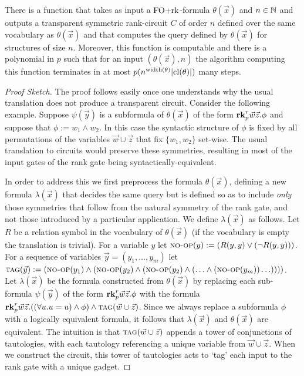 \documentclass[a4paper,UKenglish]{lipics-v2018}
\begin{document}
\begin{lemma}
  There is a function that takes as input a $\text{\upshape FO+rk}$-formula $\theta(\vec{x})$
  and $n \in \mathbb{N}$ and outputs a transparent symmetric rank-circuit $C$ of
  order $n$ defined over the same vocabulary as $\theta(\vec{x})$ and that
  computes the query defined by $\theta(\vec{x})$ for structures of size $n$.
  Moreover, this function is computable and there is a polynomial in $p$ such
  that for an input $(\theta(\vec{x}), n)$ the algorithm computing this function
  terminates in at most $p(n^{\mathrm{width}(\theta)}\vert \mathrm{cl}(\theta) \vert)$ many
  steps.
  \label{lem:translating-FOrk}
  
\end{lemma}
\begin{proof}[Proof Sketch]
  
  The proof follows easily once one understands why the usual translation does
  not produce a transparent circuit. Consider the following example. Suppose
  $\psi(\vec{y})$ is a subformula of $\theta(\vec{x})$ of the form $\text{\textbf{rk}}^r_p
  \vec{w} \vec{z} . \phi$ and suppose that $\phi := w_1 \land w_2$. In this case
  the syntactic structure of $\phi$ is fixed by all permutations of the
  variables $\vec{w} \cup \vec{z}$ that fix $\{w_1, w_2\}$ set-wise. The usual
  translation to circuits would preserve these symmetries, resulting in most of
  the input gates of the rank gate being syntactically-equivalent.
  
  In order to address this we first preprocess the formula $\theta(\vec{x})$,
  defining a new formula $\lambda (\vec{x})$ that decides the same query but is
  defined so as to include \emph{only} those symmetries that follow from the
  natural symmetry of the rank gate, and not those introduced by a particular
  application. We define $\lambda(\vec{x})$ as follows. Let $R$ be a relation
  symbol in the vocabulary of $\theta(\vec{x})$ (if the vocabulary is empty the
  translation is trivial). For a variable $y$ let ${\normalfont\textsc{no-op}}(y) := (R(y, y)
  \lor (\neg R(y, y)))$. For a sequence of variables $\vec{y} = (y_1, \ldots,
  y_m)$ let ${\normalfont\textsc{tag}} (\vec{y}) := ({\normalfont\textsc{no-op}}(y_1) \land ({\normalfont\textsc{no-op}}(y_2) \land
  ( {\normalfont\textsc{no-op}}(y_2) \land ( \ldots \land ({\normalfont\textsc{no-op}}(y_m)) \ldots))))$. Let
  $\lambda (\vec{x})$ be the formula constructed from $\theta(\vec{x})$ by
  replacing each sub-formula $\psi(\vec{y})$ of the form $\text{\textbf{rk}}^r_p \vec{w}
  \vec{z} . \phi$ with the formula $\text{\textbf{rk}}^r_p \vec{w}\vec{z} . ((\forall u . u =
  u) \land \phi) \land {\normalfont\textsc{tag}}(\vec{w} \cup \vec{z})$. Since we always replace
  a subformula $\phi$ with a logically equivalent formula, it follows that
  $\lambda (\vec{x})$ and $\theta (\vec{x})$ are equivalent. The intuition is
  that ${\normalfont\textsc{tag}}(\vec{w} \cup \vec{z})$ appends a tower of conjunctions of
  tautologies, with each tautology referencing a unique variable from $\vec{w}
  \cup \vec{z}$. When we construct the circuit, this tower of tautologies acts
  to `tag' each input to the rank gate with a unique gadget.


\end{proof}
\end{document}
